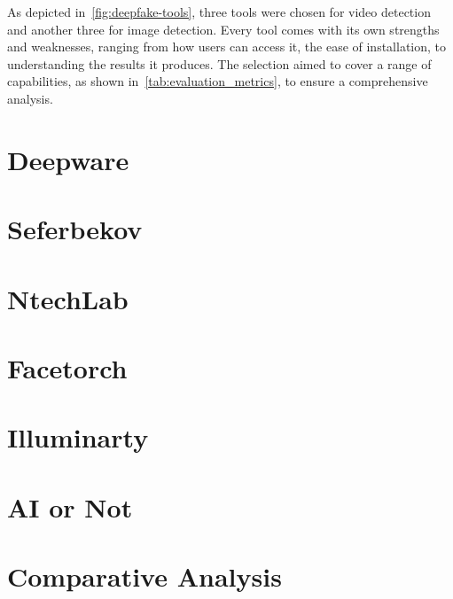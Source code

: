 As depicted in~\autoref{fig:deepfake-tools}, three tools were chosen for video 
detection and another three for image detection. Every tool comes with its own 
strengths and weaknesses, ranging from how users can access it, the ease of 
installation, to understanding the results it produces. The selection aimed to 
cover a range of capabilities, as shown in~\autoref{tab:evaluation_metrics}, 
to ensure a comprehensive analysis.

\section{Deepware}
\section{Seferbekov}
\section{NtechLab}
\section{Facetorch}
\section{Illuminarty}
\section{AI or Not}
\section{Comparative Analysis}